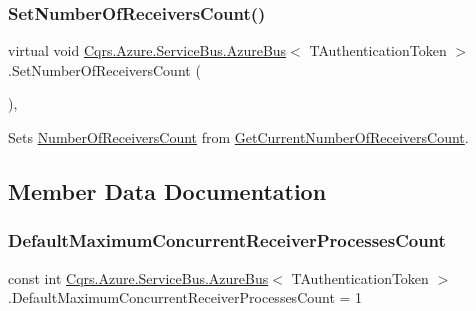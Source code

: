 \subsubsection{\texorpdfstring{Set\+Number\+Of\+Receivers\+Count()}{SetNumberOfReceiversCount()}}
{\footnotesize\ttfamily virtual void \hyperlink{classCqrs_1_1Azure_1_1ServiceBus_1_1AzureBus}{Cqrs.\+Azure.\+Service\+Bus.\+Azure\+Bus}$<$ T\+Authentication\+Token $>$.Set\+Number\+Of\+Receivers\+Count (\begin{DoxyParamCaption}{ }\end{DoxyParamCaption})\hspace{0.3cm}{\ttfamily [protected]}, {\ttfamily [virtual]}}



Sets \hyperlink{classCqrs_1_1Azure_1_1ServiceBus_1_1AzureBus_a65ca2b61bf8f2dba9d0e0f54ec64c2b9_a65ca2b61bf8f2dba9d0e0f54ec64c2b9}{Number\+Of\+Receivers\+Count} from \hyperlink{classCqrs_1_1Azure_1_1ServiceBus_1_1AzureBus_a8489f49aa20b972411e12465baa1bd14_a8489f49aa20b972411e12465baa1bd14}{Get\+Current\+Number\+Of\+Receivers\+Count}. 



\subsection{Member Data Documentation}
\mbox{\label{classCqrs_1_1Azure_1_1ServiceBus_1_1AzureBus_a12c3d07b7ad1836e85a449e6adc8b5df_a12c3d07b7ad1836e85a449e6adc8b5df}} 
\subsubsection{\texorpdfstring{Default\+Maximum\+Concurrent\+Receiver\+Processes\+Count}{DefaultMaximumConcurrentReceiverProcessesCount}}
{\footnotesize\ttfamily const int \hyperlink{classCqrs_1_1Azure_1_1ServiceBus_1_1AzureBus}{Cqrs.\+Azure.\+Service\+Bus.\+Azure\+Bus}$<$ T\+Authentication\+Token $>$.Default\+Maximum\+Concurrent\+Receiver\+Processes\+Count = 1\hspace{0.3cm}{\ttfamily [protected]}}



